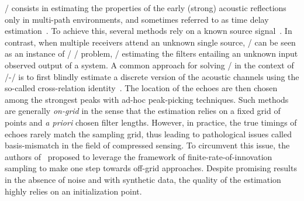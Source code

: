 
\AERdef/ consists in estimating the properties of the early (strong) acoustic reflections only in multi-path environments, and sometimes referred to as time delay estimation~.
To achieve this, several methods rely on a known source signal~.
In contrast, when multiple receivers attend an unknown single source, \AER/ can be seen as an instance of \SIMOdef/ \BCEdef/ problem, \ie/ estimating the filters entailing an unknown input observed output of a system.
A common approach for solving \AER/ in the context of \SIMO/-\BCE/ is to first blindly estimate a discrete version of the acoustic channels using the so-called cross-relation identity~.
The location of the echoes are then chosen among the strongest peaks with ad-hoc peak-picking techniques.
Such methods are generally \emph{on-grid} in the sense that the estimation relies on a fixed grid of points and \textit{a priori} chosen filter lengths.
However, in practice, the true timings of echoes rarely match the sampling grid, thus leading to pathological issues called basis-mismatch in the field of compressed sensing.
To circumvent this issue, the authors of~ proposed to leverage the framework of finite-rate-of-innovation sampling to make one step towards off-grid approaches.
Despite promising results in the absence of noise and with synthetic data, the quality of the estimation highly relies on an initialization point.

